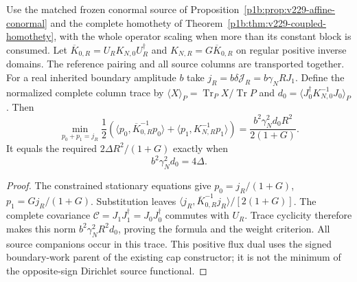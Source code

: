 \documentclass[12pt,a4paper]{article}
\begin{document}
\begin{theorem}
\label{p3e:thm:v229-conormal-cap}
Use the matched frozen conormal source of
Proposition~\ref{p1b:prop:v229-affine-conormal} and the complete
homothety of Theorem~\ref{p1b:thm:v229-coupled-homothety}, with the
whole operator scaling when more than its constant block is consumed.
Let $\overline K_{0,R}=U_RK_{N,0}U_R^\dagger$ and
$K_{N,R}=G\overline K_{0,R}$ on regular positive inverse domains.
The reference pairing and all source columns are transported together.
For a real inherited boundary amplitude $b$ take
$j_R=b\delta\mathcal J_R=b\gamma_NR J_1$. Define the normalized
complete column trace by $\langle X\rangle_P=\operatorname{Tr}_P X/
\operatorname{Tr}P$ and $d_0=\langle J_0^\dagger K_{N,0}^{-1}J_0\rangle_P$.
Then
\[
 \min_{p_0+p_1=j_R}\frac12\left(
 \langle p_0,\overline K_{0,R}^{-1}p_0\rangle+
 \langle p_1,K_{N,R}^{-1}p_1\rangle\right)
 =\frac{b^2\gamma_N^2d_0R^2}{2(1+G)}.
\]
It equals the required $2\Delta R^2/(1+G)$ exactly when
\begin{equation}
 b^2\gamma_N^2d_0=4\Delta.
 \label{p3e:eq:v229-amplitude-target}
\end{equation}
\end{theorem}
\begin{proof}
The constrained stationary equations give $p_0=j_R/(1+G)$,
$p_1=Gj_R/(1+G)$. Substitution leaves
$\langle j_R,\overline K_{0,R}^{-1}j_R\rangle/[2(1+G)]$.
The complete covariance $\mathcal C=J_1J_1^\dagger=J_0J_0^\dagger$
commutes with $U_R$. Trace cyclicity therefore makes this norm
$b^2\gamma_N^2R^2d_0$, proving the formula and the weight criterion.
All source companions occur in this trace. This positive flux dual
uses the signed boundary-work parent of the existing cap constructor;
it is not the minimum of the opposite-sign Dirichlet source functional.
\end{proof}
\end{document}

